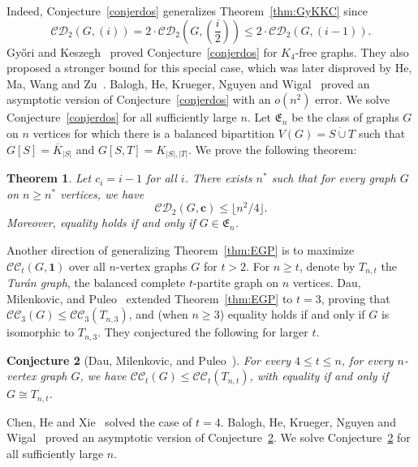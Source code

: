 \documentclass[11pt]{article}
\numberwithin{equation}{section}
\newtheorem{theorem}{Theorem}[section]
\newtheorem{conjecture}[theorem]{Conjecture}
\theoremstyle{remark}
\newcommand{\dotcupunion}{\mathbin{\dot\cup}}
\newcommand{\CC}{\mathcal{CC}}
\newcommand{\CD}{\mathcal{CD}}
\begin{document}
Indeed, Conjecture~\ref{conjerdos} generalizes Theorem~\ref{thm:GyKKC} since
\begin{equation*}
\CD_2(G,(i)) = 2\cdot\CD_2(G,(\frac i2))\le 2\cdot\CD_2(G,(i-1)).
\end{equation*}
Gy\H{o}ri and Keszegh~\cite{GyoriKeszegh} proved Conjecture~\ref{conjerdos} for \(K_4\)-free graphs.
They also proposed a stronger bound for this special case, which was later disproved by He, Ma, Wang and Zu~\cite{HeMaWangZu}.
Balogh, He, Krueger, Nguyen and Wigal~\cite{BHKNW} proved an asymptotic version of Conjecture~\ref{conjerdos} with
an \(o(n^2)\) error. We solve Conjecture~\ref{conjerdos} for all sufficiently large \(n\).
Let \(\mathfrak E_n\) be the class of graphs \(G\) on \(n\) vertices for which there is a balanced
bipartition \(V(G)=S\dotcupunion T\) such that \(G[S]=\overline K_{|S|}\) and \(G[S,T]=K_{|S|,|T|}\).
We prove the following theorem:

\begin{theorem}\label{dec:thm:main}
  Let \(c_i = i-1\) for all \(i\). There exists \(n^\ast\) such that for
  every graph \(G\) on \(n\ge n^\ast\) vertices, we have
  \begin{equation*}
  \CD_2(G,\mathbf{c}) \le \lfloor n^2/4\rfloor.
  \end{equation*}
  Moreover, equality holds if and only if \(G\in\mathfrak E_n\).
\end{theorem}

Another direction of generalizing Theorem~\ref{thm:EGP} is to maximize \(\CC_t(G,\mathbf 1)\) over
all \(n\)-vertex graphs \(G\) for \(t>2\). For \(n\ge t\), denote by \(T_{n,t}\) the \emph{Tur\'an graph},
the balanced complete \(t\)-partite graph on \(n\) vertices. Dau, Milenkovic, and Puleo~\cite{DMP} extended
Theorem~\ref{thm:EGP} to \(t=3\), proving that \(\CC_3(G) \le \CC_3(T_{n,3})\), and (when \(n \ge 3\)) equality
holds if and only if \(G\) is isomorphic to \(T_{n,3}\). They conjectured the following for larger \(t\).
\begin{conjecture}[Dau, Milenkovic, and Puleo~\cite{DMP}]\label{conj:clique_cover}
For every \(4\le t\le n\), for every \(n\)-vertex graph \(G\), we have \(\CC_t(G) \le \CC_t(T_{n,t})\),
with equality if and only if \(G \cong T_{n,t}\). 
\end{conjecture}

Chen, He and Xie~\cite{ChenHeXie} solved the case of \(t=4\). Balogh, He, Krueger, Nguyen and Wigal~\cite{BHKNW}
proved an asymptotic version of Conjecture~\ref{conj:clique_cover}.
We solve Conjecture~\ref{conj:clique_cover} for all sufficiently large \(n\).
\end{document}
